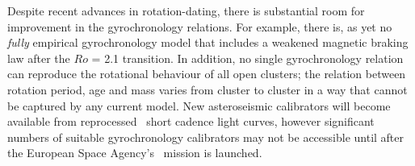 Despite recent advances in rotation-dating, there is substantial room for
improvement in the gyrochronology relations.
For example, there is, as yet no {\it fully} empirical gyrochronology model
that includes a weakened magnetic braking law after the $Ro$ = 2.1 transition.
In addition, no single gyrochronology relation can reproduce the rotational
behaviour of all open clusters; the relation between rotation period, age and
mass varies from cluster to cluster in a way that cannot be captured by
any current model.
New asteroseismic calibrators will become available from reprocessed \kepler\
short cadence light curves, however significant numbers of suitable
gyrochronology calibrators may not be accessible until after the European
Space Agency's \plato\ mission is launched.

